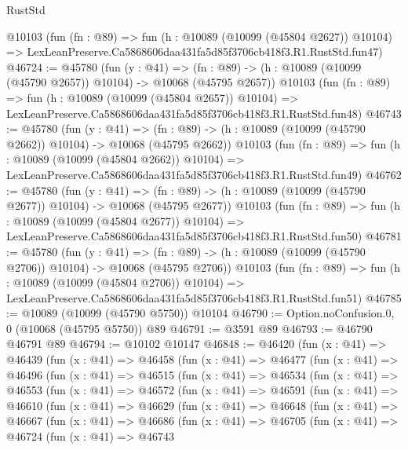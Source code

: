 \begin{lexlean}{RustStd}
\begin{coremodule}
    @10103
    (fun (fn : @89) =>
    fun (h : @10089 (@10099 (@45804 @2627)) @10104) =>
    LexLeanPreserve.Ca5868606daa431fa5d85f3706cb418f3.R1.RustStd.fun47)
@46724 := @45780
    (fun (y : @41) =>
    (fn : @89) -> (h : @10089 (@10099 (@45790 @2657)) @10104) -> @10068 (@45795 @2657))
    @10103
    (fun (fn : @89) =>
    fun (h : @10089 (@10099 (@45804 @2657)) @10104) =>
    LexLeanPreserve.Ca5868606daa431fa5d85f3706cb418f3.R1.RustStd.fun48)
@46743 := @45780
    (fun (y : @41) =>
    (fn : @89) -> (h : @10089 (@10099 (@45790 @2662)) @10104) -> @10068 (@45795 @2662))
    @10103
    (fun (fn : @89) =>
    fun (h : @10089 (@10099 (@45804 @2662)) @10104) =>
    LexLeanPreserve.Ca5868606daa431fa5d85f3706cb418f3.R1.RustStd.fun49)
@46762 := @45780
    (fun (y : @41) =>
    (fn : @89) -> (h : @10089 (@10099 (@45790 @2677)) @10104) -> @10068 (@45795 @2677))
    @10103
    (fun (fn : @89) =>
    fun (h : @10089 (@10099 (@45804 @2677)) @10104) =>
    LexLeanPreserve.Ca5868606daa431fa5d85f3706cb418f3.R1.RustStd.fun50)
@46781 := @45780
    (fun (y : @41) =>
    (fn : @89) -> (h : @10089 (@10099 (@45790 @2706)) @10104) -> @10068 (@45795 @2706))
    @10103
    (fun (fn : @89) =>
    fun (h : @10089 (@10099 (@45804 @2706)) @10104) =>
    LexLeanPreserve.Ca5868606daa431fa5d85f3706cb418f3.R1.RustStd.fun51)
@46785 := @10089 (@10099 (@45790 @5750)) @10104
@46790 := Option.noConfusion.{0, 0} (@10068 (@45795 @5750)) @89
@46791 := @3591 @89
@46793 := @46790 @46791 @89
@46794 := @10102 @10147
@46848 := @46420
    (fun (x : @41) =>
    @46439
      (fun (x : @41) =>
      @46458
        (fun (x : @41) =>
        @46477
          (fun (x : @41) =>
          @46496
            (fun (x : @41) =>
            @46515
              (fun (x : @41) =>
              @46534
                (fun (x : @41) =>
                @46553
                  (fun (x : @41) =>
                  @46572
                    (fun (x : @41) =>
                    @46591
                      (fun (x : @41) =>
                      @46610
                        (fun (x : @41) =>
                        @46629
                          (fun (x : @41) =>
                          @46648
                            (fun (x : @41) =>
                            @46667
                              (fun (x : @41) =>
                              @46686
                                (fun (x : @41) =>
                                @46705
                                  (fun (x : @41) =>
                                  @46724
                                    (fun (x : @41) =>
                                    @46743

\end{coremodule}
\end{lexlean}
